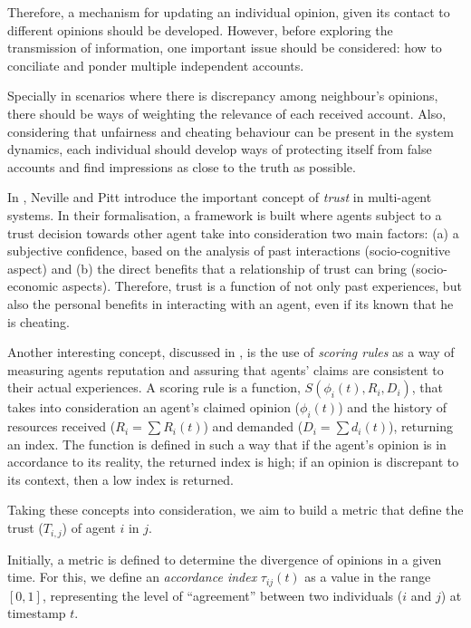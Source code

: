 \documentclass[conference,compsoc]{IEEEtran}
\begin{document}
Therefore, a mechanism for updating an individual opinion, given its contact to different opinions should be developed. However, before exploring the transmission of information, one important issue should be considered: how to conciliate and ponder multiple independent accounts.

Specially in scenarios where there is discrepancy among neighbour's opinions, there should be ways of weighting the relevance of each received account. Also, considering that unfairness and cheating behaviour can be present in the system dynamics, each individual should develop ways of protecting itself from false accounts and find impressions as close to the truth as possible.


In \cite{Neville}, Neville and Pitt introduce the important concept of \emph{trust} in multi-agent systems. In their formalisation, a framework is built where agents subject to a trust decision towards other agent take into consideration two main factors: (a) a subjective confidence, based on the analysis of past interactions (socio-cognitive aspect) and (b) the direct benefits that a relationship of trust can bring (socio-economic aspects).
Therefore, trust is a function of not only past experiences, but also the personal benefits in interacting with an agent, even if its known that he is cheating.



Another interesting concept, discussed in \cite{PittDagostino}, is the use of \emph{scoring rules} as a way of measuring agents reputation and assuring that agents' claims are consistent to their actual experiences. A scoring rule is a function, $S(\phi_i(t), R_i, D_i)$, that takes into consideration an agent's claimed opinion ($\phi_i(t)$) and the history of resources received ($R_i = \sum R_i (t)$) and demanded ($D_i = \sum d_i(t)$), returning an index. The function is defined in such a way that if the agent's opinion is in accordance to its reality, the returned index is high; if an opinion is discrepant to its context, then a low index is returned.


Taking these concepts into consideration, we aim to build a metric that define the trust ($T_{i,j}$) of agent $i$ in $j$.

Initially, a metric is defined to determine the divergence of opinions in a given time. For this, we define an \emph{accordance index} $\tau_{ij}(t)$ as a value in the range $[0,1]$, representing the level of ``agreement'' between two individuals ($i$ and $j$) at timestamp $t$.
\end{document}
